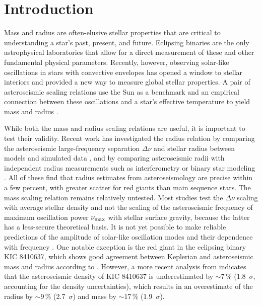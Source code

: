 
\section{Introduction}\label{intro}


Mass and radius are often-elusive stellar properties that are critical to understanding a star's past, present, and future. Eclipsing binaries are the only astrophysical laboratories that allow for a direct measurement of these and other fundamental physical parameters. Recently, however, observing solar-like oscillations in stars with convective envelopes has opened a window to stellar interiors and provided a new way to measure global stellar properties. A pair of asteroseismic scaling relations use the Sun as a benchmark and an empirical connection between these oscillations and a star's effective temperature to yield mass and radius \citep{kje95,hub10,mos13}.

While both the mass and radius scaling relations are useful, it is important to test their validity. Recent work has investigated the radius relation by comparing the asteroseismic large-frequency separation $\Delta \nu$ and stellar radius between models and simulated data \citep[e.g.][]{ste09,whi11,mig13}, and by comparing asteroseismic radii with independent radius measurements such as interferometry or binary star modeling \citep[e.g.][]{hub11,hub12,sil12}. All of these find that radius estimates from asteroseismology are precise within a few percent, with greater scatter for red giants than main sequence stars. The mass scaling relation remains relatively untested. Most studies test the $\Delta\nu$ scaling with average stellar density and not the scaling of the asteroseismic frequency of maximum oscillation power $\nu_{\rm{max}}$ with stellar surface gravity, because the latter has a less-secure theoretical basis. It is not yet possible to make reliable predictions of the amplitude of solar-like oscillation modes and their dependence with frequency \citep{chr12}. One notable exception is the red giant in the eclipsing binary KIC 8410637, which shows good agreement between Keplerian and asteroseismic mass and radius according to \citet{fra13}. However, a more recent analysis from \citet{hub14} indicates that the asteroseismic density of KIC 8410637 is underestimated by $\sim$7\,\% (1.8~$\sigma$, accounting for the density uncertainties), which results in an overestimate of the radius by $\sim$9\,\% (2.7~$\sigma$) and mass by $\sim$17\,\% (1.9~$\sigma$).


